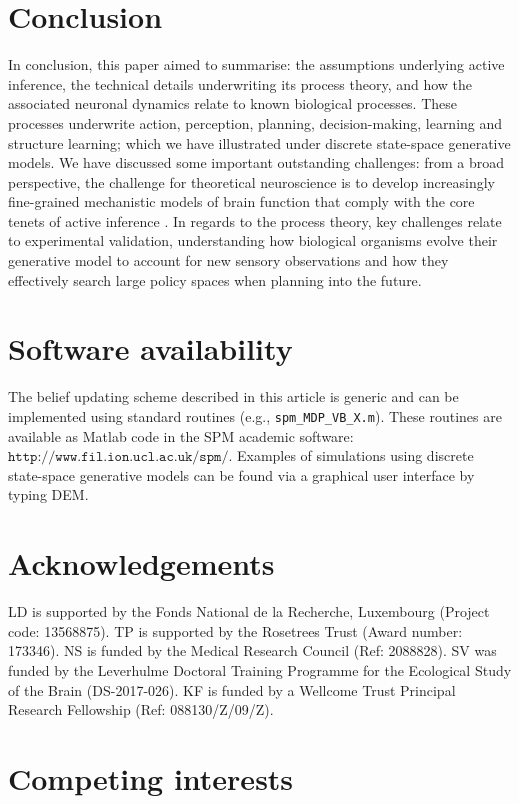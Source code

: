 \documentclass{article}
\begin{document}
\section{Conclusion}

In conclusion, this paper aimed to summarise: the assumptions underlying active inference, the technical details underwriting its process theory, and how the associated neuronal dynamics relate to known biological processes. These processes underwrite action, perception, planning, decision-making, learning and structure learning; which we have illustrated under discrete state-space generative models. We have discussed some important outstanding challenges: from a broad perspective, the challenge for theoretical neuroscience is to develop increasingly fine-grained mechanistic models of brain function that comply with the core tenets of active inference \cite{parrMarkovBlanketsInformation2019,fristonFreeEnergyPrinciple2019}. In regards to the process theory, key challenges relate to experimental validation, understanding how biological organisms evolve their generative model to account for new sensory observations and how they effectively search large policy spaces when planning into the future.

\section*{Software availability}
The belief updating scheme described in this article is generic and can be implemented using standard routines (e.g., \texttt{spm\_MDP\_VB\_X.m}). These routines are available as Matlab code in the SPM academic software: $\texttt{http://www.fil.ion.ucl.ac.uk/spm/}$. Examples of simulations using discrete state-space generative models can be found via a graphical user interface by typing DEM.

\section*{Acknowledgements}

LD is supported by the Fonds National de la Recherche, Luxembourg (Project code: 13568875). TP is supported by the Rosetrees Trust (Award number: 173346). NS is funded by the Medical Research Council (Ref: 2088828). SV was funded by the Leverhulme Doctoral Training Programme for the Ecological Study of the Brain (DS-2017-026). KF is funded by a Wellcome Trust Principal Research Fellowship (Ref: 088130/Z/09/Z).

\section*{Competing interests}
\end{document}
